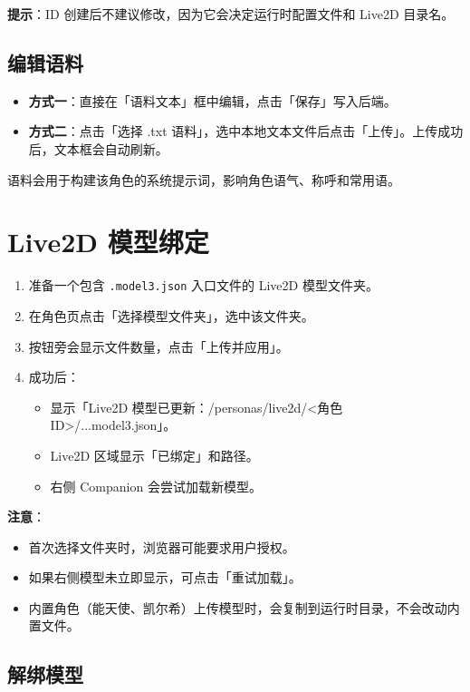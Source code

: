 \documentclass[12pt,a4paper]{article}
\begin{document}
\textbf{提示}：ID 创建后不建议修改，因为它会决定运行时配置文件和 Live2D 目录名。

\subsection{编辑语料}

\begin{itemize}
  \item \textbf{方式一}：直接在「语料文本」框中编辑，点击「保存」写入后端。
  \item \textbf{方式二}：点击「选择 .txt 语料」，选中本地文本文件后点击「上传」。上传成功后，文本框会自动刷新。
\end{itemize}

语料会用于构建该角色的系统提示词，影响角色语气、称呼和常用语。

\section{Live2D 模型绑定}

\begin{enumerate}
  \item 准备一个包含 \texttt{.model3.json} 入口文件的 Live2D 模型文件夹。
  \item 在角色页点击「选择模型文件夹」，选中该文件夹。
  \item 按钮旁会显示文件数量，点击「上传并应用」。
  \item 成功后：
  \begin{itemize}
    \item 显示「Live2D 模型已更新：/personas/live2d/<角色ID>/...model3.json」。
    \item Live2D 区域显示「已绑定」和路径。
    \item 右侧 Companion 会尝试加载新模型。
  \end{itemize}
\end{enumerate}

\textbf{注意}：

\begin{itemize}
  \item 首次选择文件夹时，浏览器可能要求用户授权。
  \item 如果右侧模型未立即显示，可点击「重试加载」。
  \item 内置角色（能天使、凯尔希）上传模型时，会复制到运行时目录，不会改动内置文件。
\end{itemize}

\subsection{解绑模型}
\end{document}
